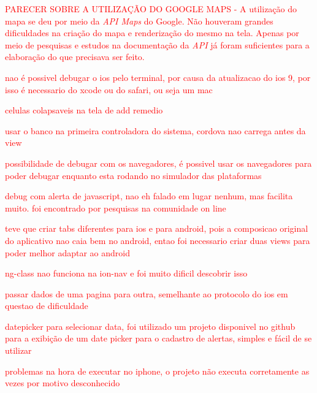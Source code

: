 \textcolor{red}{PARECER SOBRE A UTILIZAÇÃO DO GOOGLE MAPS - A utilização do mapa se deu por meio da \textit{API Maps} do Google. Não houveram grandes dificuldades na criação do mapa e renderização do mesmo na tela. Apenas por meio de pesquisas e estudos na documentação
da \textit{API} já foram suficientes para a elaboração do que precisava ser feito. }

\textcolor{red}{nao é possivel debugar o ios pelo terminal, por causa da atualizacao do ios 9, por isso é necessario do xcode ou do safari, ou seja um mac}


\textcolor{red}{celulas colapsaveis na tela de add remedio}


\textcolor{red}{usar o banco na primeira controladora do sistema, cordova nao carrega antes da view}


\textcolor{red}{possibilidade de debugar com os navegadores, é possivel usar os navegadores para poder debugar enquanto esta rodando no simulador das plataformas}


\textcolor{red}{debug com alerta de javascript, nao eh falado em lugar nenhum, mas facilita muito. foi encontrado por pesquisas na comunidade on line}


\textcolor{red}{teve que criar tabs diferentes para ios e para android, pois a composicao original do aplicativo nao caia bem no android, entao foi necessario criar duas views para poder melhor adaptar ao android}


\textcolor{red}{ng-class nao funciona na ion-nav e foi muito dificil descobrir isso}


\textcolor{red}{passar dados de uma pagina para outra, semelhante ao protocolo do ios em questao de dificuldade}


\textcolor{red}{datepicker para selecionar data, foi utilizado um projeto disponivel no github para a exibição de um date picker para o cadastro de alertas, simples e fácil de se utilizar}


\textcolor{red}{problemas na hora de executar no iphone, o projeto não executa corretamente as vezes por motivo desconhecido}

